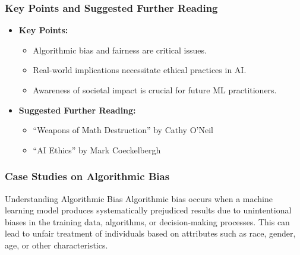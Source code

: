 \documentclass[aspectratio=169]{beamer}
\begin{document}
\begin{frame}[fragile]
    \frametitle{Key Points and Suggested Further Reading}
    \begin{itemize}
        \item \textbf{Key Points:}
            \begin{itemize}
                \item Algorithmic bias and fairness are critical issues.
                \item Real-world implications necessitate ethical practices in AI.
                \item Awareness of societal impact is crucial for future ML practitioners.
            \end{itemize}
        \item \textbf{Suggested Further Reading:}
            \begin{itemize}
                \item ``Weapons of Math Destruction'' by Cathy O'Neil
                \item ``AI Ethics'' by Mark Coeckelbergh
            \end{itemize}
    \end{itemize}
\end{frame}

\begin{frame}[fragile]
    \frametitle{Case Studies on Algorithmic Bias}
    \begin{block}{Understanding Algorithmic Bias}
        Algorithmic bias occurs when a machine learning model produces systematically prejudiced results due to unintentional biases in the training data, algorithms, or decision-making processes. This can lead to unfair treatment of individuals based on attributes such as race, gender, age, or other characteristics.
    \end{block}
\end{frame}
\end{document}
